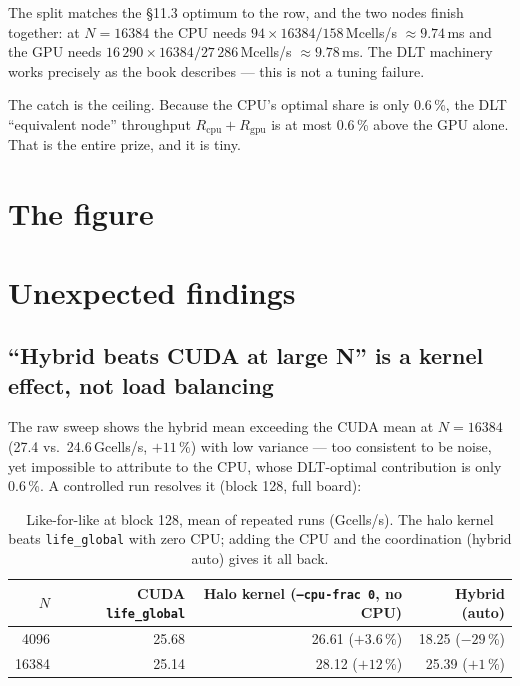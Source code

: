 \documentclass[
	english,
	letterpaper, oneside
]{article}
\begin{document}
The split matches the \S11.3 optimum to the row, and the two nodes finish together:
at $N=16384$ the CPU needs $94 \times 16384 / 158$\,Mcells/s $\approx 9.74$\,ms and
the GPU needs $16\,290 \times 16384 / 27\,286$\,Mcells/s $\approx 9.78$\,ms. The DLT
machinery works precisely as the book describes --- this is not a tuning failure.

The catch is the ceiling. Because the CPU's optimal share is only 0.6\,\%, the DLT
``equivalent node'' throughput $R_\mathrm{cpu}+R_\mathrm{gpu}$ is at most 0.6\,\%
above the GPU alone. That is the entire prize, and it is tiny.

\section{The figure}
\label{sec:figure}


\section{Unexpected findings}
\label{sec:findings}

\subsection{``Hybrid beats CUDA at large N'' is a kernel effect, not load balancing}
\label{sec:confound}

The raw sweep shows the hybrid mean exceeding the CUDA mean at $N=16384$ (27.4 vs.\
24.6\,Gcells/s, $+11$\,\%) with low variance --- too consistent to be noise, yet
impossible to attribute to the CPU, whose DLT-optimal contribution is only 0.6\,\%. A
controlled run resolves it (block 128, full board):

\begin{table}[H]
	\centering
	\caption{Like-for-like at block 128, mean of repeated runs (Gcells/s). The halo
	kernel beats \texttt{life\_global} with zero CPU; adding the CPU and the
	coordination (hybrid auto) gives it all back.}
	\label{tab:kernel}
	\begin{tabular}{@{}rrrr@{}}
		\toprule
		$N$ & CUDA \texttt{life\_global} & Halo kernel (\texttt{--cpu-frac 0}, no CPU) & Hybrid (auto) \\
		\midrule
		4096  & 25.68 & 26.61 ($+3.6$\,\%) & 18.25 ($-29$\,\%) \\
		16384 & 25.14 & 28.12 ($+12$\,\%)  & 25.39 ($+1$\,\%) \\
		\bottomrule
	\end{tabular}
\end{table}
\end{document}

